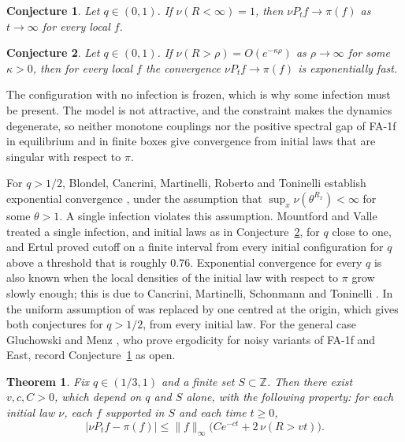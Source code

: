 \documentclass[11pt]{amsart}
\newtheorem{theorem}{Theorem}[section]
\newtheorem{conjecture}{Conjecture}
\theoremstyle{definition}
\theoremstyle{remark}
\newcommand{\Z}{\mathbb{Z}}
\begin{document}
\begin{conjecture}\label{conj:1}
Let $q\in(0,1)$. If $\nu(R<\infty)=1$, then $\nu P_t f\to\pi(f)$ as $t\to\infty$ for every local $f$.
\end{conjecture}

\begin{conjecture}\label{conj:2}
Let $q\in(0,1)$. If $\nu(R>\rho)=O(e^{-\kappa\rho})$ as $\rho\to\infty$ for some $\kappa>0$, then for every local
$f$ the convergence $\nu P_t f\to\pi(f)$ is exponentially fast.
\end{conjecture}

The configuration with no infection is frozen, which is why some infection must be present. The model is not
attractive, and the constraint makes the dynamics degenerate, so neither monotone couplings nor the positive spectral
gap of FA-1f in equilibrium and in finite boxes \cite{CMRT08,CMRT09} give convergence from initial laws that are singular with respect to $\pi$.

For $q>1/2$, Blondel, Cancrini, Martinelli, Roberto and Toninelli establish exponential convergence
\cite[Theorem~2.1]{BCMRT13}, under the assumption that $\sup_x\nu(\theta^{R_x})<\infty$ for some $\theta>1$. A single infection violates
this assumption. Mountford and Valle \cite{MV19} treated a single infection, and initial laws as in
Conjecture~\ref{conj:2}, for $q$ close to one, and Ertul \cite{Ert21} proved cutoff on a finite interval from every
initial configuration for $q$ above a threshold that is roughly $0.76$. Exponential convergence for every $q$ is also known when the local
densities of the initial law with respect to $\pi$ grow slowly enough; this is due to Cancrini, Martinelli, Schonmann
and Toninelli \cite{CMST10}. In \cite{Shm26} the uniform assumption of \cite{BCMRT13} was replaced by one centred at the
origin, which gives both conjectures for $q>1/2$, from every initial law. For the general case
Gluchowski and Menz \cite{GM26}, who prove ergodicity for noisy variants of FA-1f and East, record Conjecture~\ref{conj:1}
as open.

\begin{theorem}\label{thm:main}
Fix $q\in(1/3,1)$ and a finite set $S\subset\Z$. Then there exist $v,c,C>0$, which depend on $q$ and $S$ alone, with
the following property: for each initial law $\nu$, each $f$ supported in $S$ and each time $t\ge0$,
\begin{equation}\label{eq:main}
\bigl|\nu P_tf-\pi(f)\bigr|\le\|f\|_\infty\bigl(Ce^{-ct}+2\,\nu(R>vt)\bigr).
\end{equation}
\end{theorem}
\end{document}
